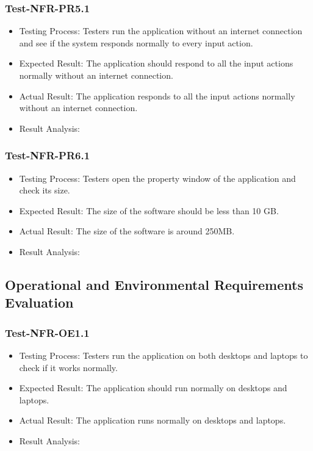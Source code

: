 \documentclass[12pt, titlepage]{article}
\begin{document}
\subsubsection{Test-NFR-PR5.1}
\begin{itemize}
    \item Testing Process: Testers run the application without an internet connection and see if the system responds normally to every input action. 
    \item Expected Result: The application should respond to all the input actions normally without an internet connection.
    \item Actual Result: The application responds to all the input actions normally without an internet connection.
    \item Result Analysis: \pass
\end{itemize}
\subsubsection{Test-NFR-PR6.1}
\begin{itemize}
    \item Testing Process: Testers open the property window of the application and check its size.
    \item Expected Result: The size of the software should be less than 10 GB. 
    \item Actual Result: The size of the software is around 250MB.
    \item Result Analysis: \pass
\end{itemize}


\subsection{Operational and Environmental Requirements Evaluation}
\subsubsection{Test-NFR-OE1.1}
\begin{itemize}
    \item Testing Process: Testers run the application on both desktops and laptops to check if it works normally.
    \item Expected Result: The application should run normally on desktops and laptops.
    \item Actual Result: The application runs normally on desktops and laptops.
    \item Result Analysis: \pass
\end{itemize}
\end{document}
